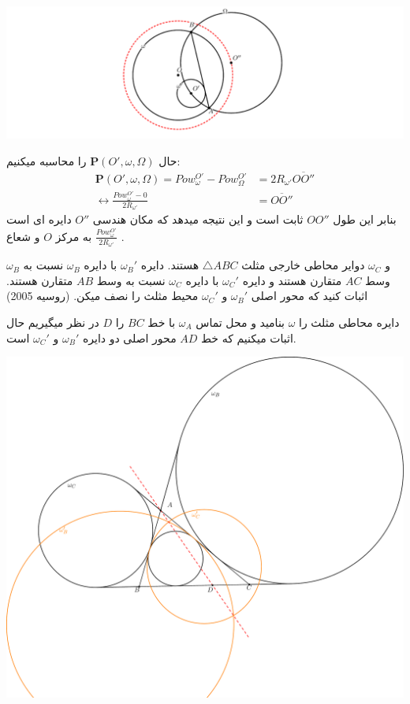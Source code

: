 \documentclass{article}
\begin{document}
\begin{center}
\includegraphics[scale=0.6]{ncavenye.pdf}
\end{center}

حال $\mathbf{P}(O',\omega,\Omega)$ را محاسبه میکنیم:
\begin{align*}
\mathbf{P}(O',\omega,\Omega)=Pow_{\omega}^{O'}-Pow_{\Omega}^{O'}&=2 R_{\omega'} \overline{OO''}\\
\leftrightarrow \frac{Pow_{\omega}^{O'}-0}{2 R_{\omega'}}&=\overline{OO''}
\end{align*}
بنابر این طول $OO''$ ثابت است و این نتیجه میدهد که مکان هندسی $O''$ دایره ای است به مرکز $O$ و شعاع $\frac{Pow_{\omega}^{O'}}{2 R_{\omega'}}$ .
\begin{exam}{}{}
 $\omega_B$ و $\omega_C$ دوایر محاطی خارجی مثلث $\triangle{ABC}$ هستند. دایره $\omega_B'$ با دایره $\omega_B$ نسبت به وسط $AC$ متقارن هستند و دایره $\omega_C'$ با دایره $\omega_C$ نسبت به وسط $AB$ متقارن هستند. اثبات کنید که محور اصلی  $\omega_B'$ و  $\omega_C'$ محیط مثلث را نصف میکن.  
({روسیه 2005})
\end{exam}
     دایره محاطی مثلث را $\omega$ بنامید و محل تماس $\omega_A$ با خط $BC$ را $D$ در نظر میگیریم حال اثبات میکنیم که خط $AD$ محور اصلی دو دایره $\omega_B'$ و $\omega_C'$ است.
\begin{center}
\includegraphics[scale=0.3]{alrussian.pdf}
\end{center}
\end{document}
